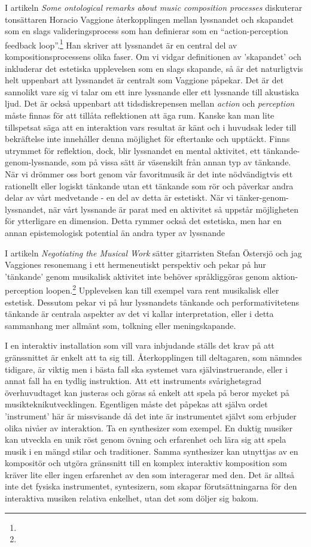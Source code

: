 \documentclass[12pt]{article}
\begin{document}
I artikeln \emph{Some ontological remarks about music composition processes} diskuterar tonsättaren Horacio Vaggione återkopplingen mellan lyssnandet och skapandet som en slags valideringsprocess som han definierar som en ``action-perception feedback loop''.\footnote{} Han skriver att lyssnandet är en central del av kompositionsprocessens olika faser. Om vi vidgar definitionen av 'skapandet' och inkluderar det estetiska upplevelsen som en slags skapande, så är det naturligtvis helt uppenbart att lyssnandet är centralt som Vaggione påpekar. Det är det sannolikt vare sig vi talar om ett inre lyssnande eller ett lyssnande till akustiska ljud. Det är också uppenbart att tidsdiskrepensen mellan \emph{action} och \emph{perception} måste finnas för att tillåta reflektionen att äga rum. Kanske kan man lite tillspetsat säga att en interaktion vars resultat är känt och i huvudsak leder till bekräftelse inte innehåller denna möjlighet för eftertanke och upptäckt. Finns utrymmet för reflektion, dock, blir lyssnandet en mental aktivitet, ett tänkande-genom-lyssnande, som på vissa sätt är väsenskilt från annan typ av tänkande. När vi drömmer oss bort genom vår favoritmusik är det inte nödvändigtvis ett rationellt eller logiskt tänkande utan ett tänkande som rör och påverkar andra delar av vårt medvetande -  en del av detta är estetiskt. När vi tänker-genom-lyssnandet, när vårt lyssnande är parat med en aktivitet så uppstår möjligheten för ytterligare en dimension. Detta rymmer också det estetiska, men har en annan epistemologisk potential än andra typer av lyssnande

I artikeln \emph{Negotiating the Musical Work} sätter gitarristen Stefan Östersjö och jag Vaggiones resonemang i ett hermeneutiskt perspektiv och pekar på hur 'tänkande' genom musikalisk aktivitet inte behöver språkliggöras genom aktion-perception loopen.\footnote{} Upplevelsen kan till exempel vara rent musikalisk eller estetisk. Dessutom pekar vi på hur lyssnandets tänkande och performativitetens tänkande är centrala aspekter av det vi kallar interpretation, eller i detta sammanhang mer allmänt som, tolkning eller meningskapande.

I en interaktiv installation som vill vara inbjudande ställs det krav på att gränssnittet är enkelt att ta sig till. Återkopplingen till deltagaren, som nämndes tidigare, är viktig men i bästa fall ska systemet vara självinstruerande, eller i annat fall ha en tydlig instruktion. Att ett instruments svårighetsgrad överhuvudtaget kan justeras och göras så enkelt att spela på beror mycket på musikteknikutvecklingen. Egentligen måste det påpekas att själva ordet 'instrument' här är missvisande då det inte är instrumentet självt som erbjuder olika nivåer av interaktion. Ta en synthesizer som exempel. En duktig musiker kan utveckla en unik röst genom övning och erfarenhet och lära sig att spela musik i en mängd stilar och traditioner. Samma synthesizer kan utnyttjas av en kompositör och utgöra gränssnitt till en komplex interaktiv komposition som kräver lite eller ingen erfarenhet av den som interagerar med den. Det är alltså inte det fysiska instrumentet, syntesizern, som skapar förutsättningarna för den interaktiva musiken relativa enkelhet, utan det som döljer sig bakom. 
\end{document}
